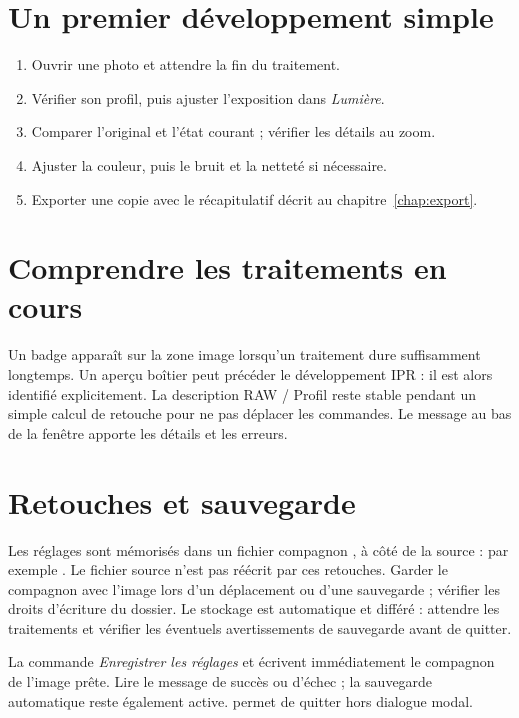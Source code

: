 \section{Un premier développement simple}
\begin{enumerate}
\item Ouvrir une photo et attendre la fin du traitement.
\item Vérifier son profil, puis ajuster l’exposition dans \emph{Lumière}.
\item Comparer l’original et l’état courant ; vérifier les détails au zoom.
\item Ajuster la couleur, puis le bruit et la netteté si nécessaire.
\item Exporter une copie avec le récapitulatif décrit au chapitre~\ref{chap:export}.
\end{enumerate}

\section{Comprendre les traitements en cours}
Un badge apparaît sur la zone image lorsqu’un traitement dure suffisamment
longtemps. Un aperçu boîtier peut précéder le développement IPR : il est alors
identifié explicitement. La description RAW / Profil reste stable pendant
un simple calcul de retouche pour ne pas déplacer les commandes.
Le message au bas de la fenêtre apporte les détails et les erreurs.


\section{Retouches et sauvegarde}
Les réglages sont mémorisés dans un fichier compagnon , à côté
de la source : par exemple . Le fichier source n’est
pas réécrit par ces retouches. Garder le compagnon avec l’image lors d’un
déplacement ou d’une sauvegarde ; vérifier les droits d’écriture du dossier.
Le stockage est automatique et différé : attendre les traitements et vérifier
les éventuels avertissements de sauvegarde avant de quitter.

La commande \emph{Enregistrer les réglages} et  écrivent
immédiatement le compagnon de l’image prête. Lire le message de succès ou
d’échec ; la sauvegarde automatique reste également active.
 permet de quitter hors dialogue modal.

